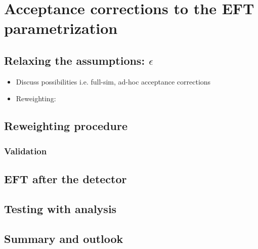 \chapter{Acceptance corrections to the EFT parametrization}
\label{chap:acceptance_studies}

\section{Relaxing the assumptions: $\epsilon$}
\begin{itemize}
    \item Discuss possibilities i.e. full-sim, ad-hoc acceptance corrections
    \item Reweighting: 
\end{itemize}

\section{Reweighting procedure}
\subsection{Validation}

\section{EFT after the detector}

\section{Testing with \Hgg analysis}

\section{Summary and outlook}
